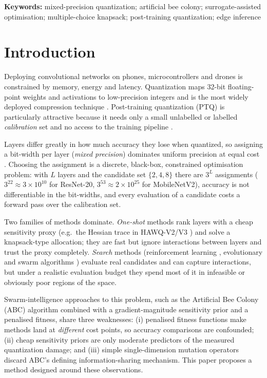 \documentclass[11pt,a4paper]{article}
\begin{document}
\noindent\textbf{Keywords:} mixed-precision quantization; artificial bee colony; surrogate-assisted
optimisation; multiple-choice knapsack; post-training quantization; edge inference

\section{Introduction}

Deploying convolutional networks on phones, microcontrollers and drones is constrained by memory,
energy and latency. Quantization maps 32-bit floating-point weights and activations to low-precision
integers and is the most widely deployed compression technique
\citep{Jacob2018,Krishnamoorthi2018,Nagel2021White,Gholami2021Survey}. Post-training quantization
(PTQ) is particularly attractive because it needs only a small unlabelled or labelled
\emph{calibration} set and no access to the training pipeline \citep{Banner2019,Nagel2020AdaRound,Li2021BRECQ}.

Layers differ greatly in how much accuracy they lose when quantized, so assigning a bit-width per
layer (\emph{mixed precision}) dominates uniform precision at equal cost
\citep{Wang2019HAQ,Dong2019HAWQ,Dong2020HAWQV2}. Choosing the assignment is a discrete, black-box,
constrained optimisation problem: with $L$ layers and the candidate set $\{2,4,8\}$ there are $3^L$
assignments ($3^{22}\approx3\times10^{10}$ for ResNet-20, $3^{53}\approx2\times10^{25}$ for MobileNetV2),
accuracy is not differentiable in the bit-widths, and every evaluation of a candidate costs a forward
pass over the calibration set.

Two families of methods dominate. \emph{One-shot} methods rank layers with a cheap sensitivity proxy
(e.g.\ the Hessian trace in HAWQ-V2/V3 \citep{Dong2020HAWQV2,Yao2021HAWQV3}) and solve a knapsack-type
allocation; they are fast but ignore interactions between layers and trust the proxy completely.
\emph{Search} methods (reinforcement learning \citep{Wang2019HAQ}, evolutionary and swarm
algorithms \citep{Yuan2020EvoQ,Bodner2022GradFreeBits}) evaluate real candidates and can capture
interactions, but under a realistic evaluation budget they spend most of it in infeasible or
obviously poor regions of the space.

Swarm-intelligence approaches to this problem, such as the Artificial Bee Colony (ABC) algorithm
\citep{Karaboga2007} combined with a gradient-magnitude sensitivity prior and a penalised fitness, share
three weaknesses: (i) penalised fitness functions make methods land at \emph{different} cost points, so
accuracy comparisons are confounded; (ii) cheap sensitivity priors are only moderate predictors of the
measured quantization damage; and (iii) simple single-dimension mutation operators discard ABC's
defining information-sharing mechanism. This paper proposes a method designed around these
observations.
\end{document}
